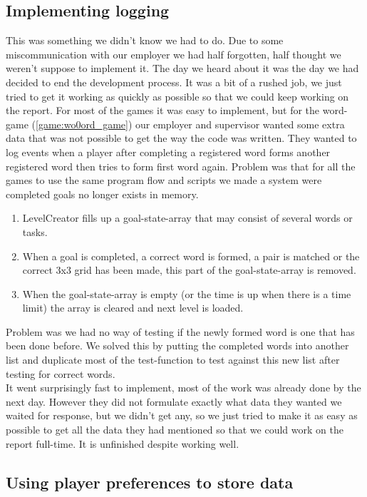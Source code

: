\subsection{Implementing logging}
This was something we didn't know we had to do. Due to some miscommunication with our employer we had half forgotten, half thought we weren't suppose to implement it. The day we heard about it was the day we had decided to end the development process. It was a bit of a rushed job, we just tried to get it working as quickly as possible so that we could keep working on the report. For most of the games it was easy to implement, but for the word-game (\ref{game:wo0ord_game}) our employer and supervisor wanted some extra data that was not possible to get the way the code was written. They wanted to log events when a player after completing a registered word forms another registered word  then tries to form first word again. Problem was that for all the games to use the same program flow and scripts we made a system were completed goals no longer exists in memory. 
\begin{enumerate}
	\item LevelCreator fills up a goal-state-array that may consist of several words or tasks.
	\item When a goal is completed, a correct word is formed, a pair is matched or the correct 3x3 grid has been made, this part of the goal-state-array is removed.
	\item When the goal-state-array is empty (or the time is up when there is a time limit) the array is cleared and next level is loaded.
\end{enumerate}
Problem was we had no way of testing if the newly formed word is one that has been done before. We solved this by putting the completed words into another list and duplicate most of the test-function to test against this new list after testing for correct words.\\ It went surprisingly fast to implement, most of the work was already done by the next day. However they did not formulate exactly what data they wanted we waited for response, but we didn't get any, so we just tried to make it as easy as possible to get all the data they had mentioned so that we could work on the report full-time. It is unfinished despite working well.

\subsection{Using player preferences to store data}
